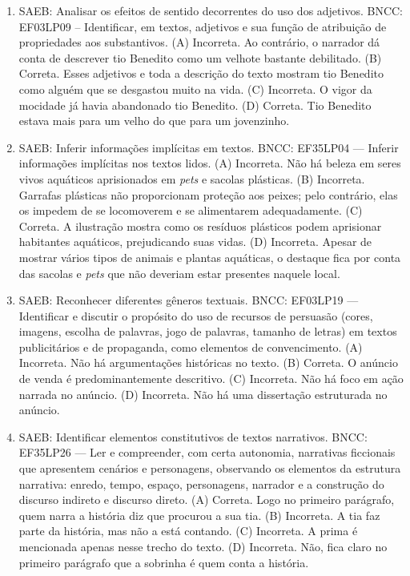 \begin{enumerate}
\item
SAEB: Analisar os efeitos de sentido decorrentes do uso dos adjetivos.
BNCC: EF03LP09 -- Identificar, em textos, adjetivos e sua função de atribuição de propriedades
aos substantivos.
(A) Incorreta. Ao contrário, o narrador dá conta de descrever tio Benedito como um velhote bastante debilitado.
(B) Correta. Esses adjetivos e toda a descrição do texto mostram tio Benedito como alguém que se desgastou muito na vida.
(C) Incorreta. O vigor da mocidade já havia abandonado tio Benedito.
(D) Correta. Tio Benedito estava mais para um velho do que para um jovenzinho.

\item
SAEB: Inferir informações implícitas em textos. 
BNCC: EF35LP04 --- Inferir informações implícitas nos textos lidos. 
(A) Incorreta. Não há beleza em seres vivos aquáticos aprisionados em \emph{pets} e sacolas plásticas. 
(B) Incorreta. Garrafas plásticas não proporcionam proteção aos peixes; pelo contrário, elas os impedem de se locomoverem e se alimentarem adequadamente. 
(C) Correta. A ilustração mostra como os resíduos plásticos podem aprisionar habitantes aquáticos, prejudicando suas vidas. 
(D) Incorreta. Apesar de mostrar vários tipos de animais e plantas aquáticas, o destaque fica por conta das sacolas e \emph{pets} que não deveriam estar presentes naquele local.

\item
SAEB: Reconhecer diferentes gêneros textuais. 
BNCC: EF03LP19 --- Identificar e discutir o propósito do uso de recursos de persuasão (cores, imagens, escolha de palavras, jogo de palavras, tamanho de letras) em textos publicitários e de propaganda, como elementos de convencimento. 
(A) Incorreta. Não há argumentações históricas no texto. 
(B) Correta. O anúncio de venda é predominantemente descritivo. 
(C) Incorreta. Não há foco em ação narrada no anúncio. 
(D) Incorreta. Não há uma dissertação estruturada no anúncio.

\item
SAEB: Identificar elementos constitutivos de textos narrativos. 
BNCC: EF35LP26 --- Ler e compreender, com certa autonomia, narrativas ficcionais que apresentem cenários e personagens, observando os elementos da estrutura narrativa: enredo, tempo, espaço, personagens, narrador e a construção do discurso indireto e discurso direto. 
(A) Correta. Logo no primeiro parágrafo, quem narra a história diz que procurou a sua tia. 
(B) Incorreta. A tia faz parte da história, mas não a está contando. 
(C) Incorreta. A prima é mencionada apenas nesse trecho do texto. 
(D) Incorreta. Não, fica claro no primeiro parágrafo que a sobrinha é quem conta a história.


\end{enumerate}
